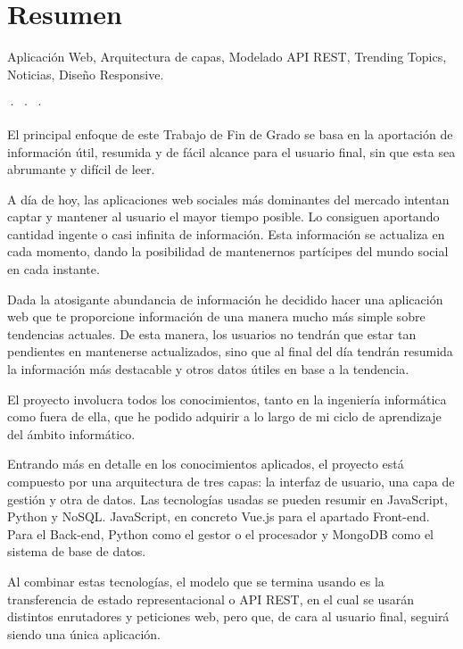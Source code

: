 \begingroup

\chapter*{Resumen}

\noindent{} Aplicación Web, Arquitectura de capas, Modelado API REST, Trending Topics, Noticias, Diseño Responsive.
\begin{center}
· · ·
\end{center}

El principal enfoque de este Trabajo de Fin de Grado se basa en la aportación de información útil, resumida y de fácil alcance para el usuario final, sin que esta sea abrumante y difícil de leer.

\vspace{0.3cm}

A día de hoy, las aplicaciones web sociales más dominantes del mercado intentan captar y mantener al usuario el mayor tiempo posible. Lo consiguen aportando cantidad ingente o casi infinita de información. Esta información se actualiza en cada momento, dando la posibilidad de mantenernos partícipes del mundo social en cada instante.

\vspace{0.3cm}

Dada la atosigante abundancia de información he decidido hacer una aplicación web que te proporcione información de una manera mucho más simple sobre tendencias actuales. De esta manera, los usuarios no tendrán que estar tan pendientes en mantenerse actualizados, sino que al final del día tendrán resumida la información más destacable y otros datos útiles en base a la tendencia.

\vspace{0.3cm}

El proyecto involucra todos los conocimientos, tanto en la ingeniería informática como fuera de ella, que he podido adquirir a lo largo de mi ciclo de aprendizaje del ámbito informático.

\vspace{0.3cm}

Entrando más en detalle en los conocimientos aplicados, el proyecto está compuesto por una arquitectura de tres capas: la interfaz de usuario, una capa de gestión y otra de datos. Las tecnologías usadas se pueden resumir en JavaScript, Python y NoSQL. JavaScript, en concreto Vue.js para el apartado Front-end. Para el Back-end, Python como el gestor o el procesador y MongoDB como el sistema de base de datos.

\vspace{0.3cm}

Al combinar estas tecnologías, el modelo que se termina usando es la transferencia de estado representacional o API REST, en el cual se usarán distintos enrutadores y peticiones web, pero que, de cara al usuario final, seguirá siendo una única aplicación.

\vfill
